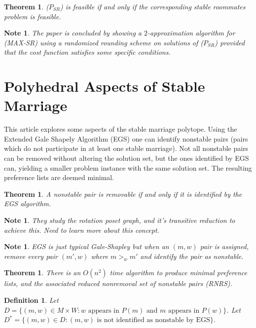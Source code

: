 \documentclass{article}
\newtheorem{theorem}[fact]{Theorem}
\newtheorem{definition}[fact]{Definition}
\newtheorem{note}[fact]{Note}
\begin{document}
\begin{theorem}
($P_{SR}$) is feasible if and only if the corresponding stable roommates problem is feasible.
\end{theorem}

\begin{note}
The paper is concluded by showing a $2$-approximation algorithm for (MAX-SR) using a randomized rounding scheme on solutions of ($P_{SR}$) provided that the cost function satisfies some specific conditions.
\end{note}

\section{Polyhedral Aspects of Stable Marriage}
This article \cite{eirinakis2013polyhedral} explores some aspects of the stable marriage polytope. Using the Extended Gale Shapely Algorithm (EGS) one can identify nonstable pairs (pairs which do not participate in at least one stable marriage). Not all nonstable pairs can be removed without altering the solution set, but the ones identified by EGS can, yielding a smaller problem instance with the same solution set.  The resulting preference lists are deemed minimal.
\begin{theorem}
A nonstable pair is removable if and only if it is identified by the EGS algorithm.
\end{theorem}
\begin{note}
They study the rotation poset graph, and it's transitive reduction to achieve this. Need to learn more about this concept.
\end{note}
\begin{note}
EGS is just typical Gale-Shapley but when an $(m,w)$ pair is assigned, remove every pair $(m',w)$ where $m >_w m'$ and identify the pair as nonstable.
\end{note}
\begin{theorem}
There is an $O(n^2)$ time algorithm to produce minimal preference lists, and the associated reduced nonremoval set of nonstable pairs (RNRS).
\label{theorem:rnrs}
\end{theorem}
\begin{definition}
Let $D = \{(m,w) \in M \times W : w \text{ appears in } P(m) \text{ and $m$ appears in } P(w)\}$. Let $D^* = \{(m,w) \in D : (m,w) \text{ is not identified as nonstable by EGS}\}$.
\end{definition}
\end{document}

